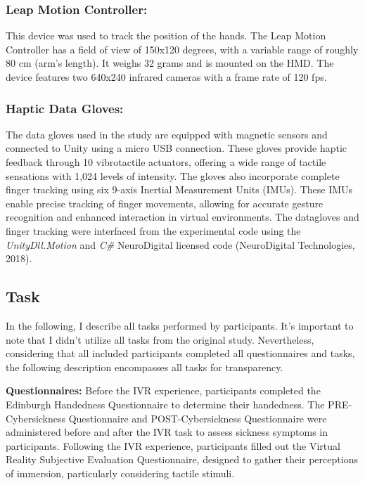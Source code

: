 \documentclass[12pt,oneside,openright]{report}
\begin{document}
\subsubsection*{Leap Motion Controller:}
This device was used to track the position of the hands. The Leap Motion Controller has a field of view of 150x120 degrees, with a variable range of roughly 80 cm (arm's length). It weighs 32 grams and is mounted on the HMD. The device features two 640x240 infrared cameras with a frame rate of 120 fps.

\subsubsection*{Haptic Data Gloves:}
The data gloves used in the study are equipped with magnetic sensors and connected to Unity using a micro USB connection. These gloves provide haptic feedback through 10 vibrotactile actuators, offering a wide range of tactile sensations with 1,024 levels of intensity. The gloves also incorporate complete finger tracking using six 9-axis Inertial Measurement Units (IMUs). These IMUs enable precise tracking of finger movements, allowing for accurate gesture recognition and enhanced interaction in virtual environments. The datagloves and finger tracking were interfaced from the experimental code using the \textit{UnityDll.Motion} and \textit{C\#} NeuroDigital licensed code (NeuroDigital Technologies, 2018).


\subsection*{Task}

In the following, I describe all tasks performed by participants. It's important to note that I didn't utilize all tasks from the original study. Nevertheless, considering that all included participants completed all questionnaires and tasks, the following description encompasses all tasks for transparency.

\textbf{Questionnaires:} Before the IVR experience, participants completed the Edinburgh Handedness Questionnaire to determine their handedness. The PRE-Cybersickness Questionnaire and POST-Cybersickness Questionnaire were administered before and after the IVR task to assess sickness symptoms in participants. Following the IVR experience, participants filled out the Virtual Reality Subjective Evaluation Questionnaire, designed to gather their perceptions of immersion, particularly considering tactile stimuli. 
\end{document}
